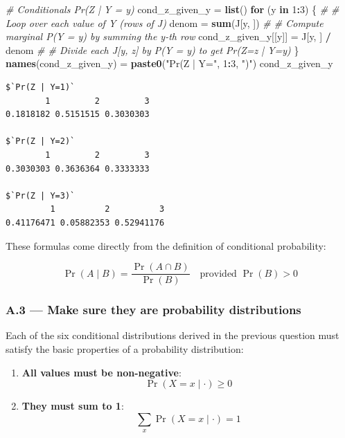 \documentclass[
]{article}
\newenvironment{Shaded}{\begin{snugshade}}{\end{snugshade}}
\newcommand{\CommentTok}[1]{\textcolor[rgb]{0.56,0.35,0.01}{\textit{#1}}}
\newcommand{\ControlFlowTok}[1]{\textcolor[rgb]{0.13,0.29,0.53}{\textbf{#1}}}
\newcommand{\DecValTok}[1]{\textcolor[rgb]{0.00,0.00,0.81}{#1}}
\newcommand{\FunctionTok}[1]{\textcolor[rgb]{0.13,0.29,0.53}{\textbf{#1}}}
\newcommand{\NormalTok}[1]{#1}
\newcommand{\OtherTok}[1]{\textcolor[rgb]{0.56,0.35,0.01}{#1}}
\newcommand{\SpecialCharTok}[1]{\textcolor[rgb]{0.81,0.36,0.00}{\textbf{#1}}}
\newcommand{\StringTok}[1]{\textcolor[rgb]{0.31,0.60,0.02}{#1}}
\begin{document}
\begin{Shaded}
\begin{Highlighting}[]
\CommentTok{\# Conditionals Pr(Z | Y = y)}
\NormalTok{cond\_z\_given\_y }\OtherTok{=} \FunctionTok{list}\NormalTok{() }
\ControlFlowTok{for}\NormalTok{ (y }\ControlFlowTok{in} \DecValTok{1}\SpecialCharTok{:}\DecValTok{3}\NormalTok{) \{ }\CommentTok{\# \# Loop over each value of Y (rows of J)}
\NormalTok{  denom }\OtherTok{=} \FunctionTok{sum}\NormalTok{(J[y, ]) }\CommentTok{\# \# Compute marginal P(Y = y) by summing the y{-}th row}
\NormalTok{  cond\_z\_given\_y[[y]] }\OtherTok{=}\NormalTok{ J[y, ] }\SpecialCharTok{/}\NormalTok{ denom }\CommentTok{\# \# Divide each J[y, z] by P(Y = y) to get Pr(Z=z | Y=y)}
\NormalTok{\}}
\FunctionTok{names}\NormalTok{(cond\_z\_given\_y) }\OtherTok{=} \FunctionTok{paste0}\NormalTok{(}\StringTok{"Pr(Z | Y="}\NormalTok{, }\DecValTok{1}\SpecialCharTok{:}\DecValTok{3}\NormalTok{, }\StringTok{")"}\NormalTok{)}
\NormalTok{cond\_z\_given\_y}
\end{Highlighting}
\end{Shaded}

\begin{verbatim}
$`Pr(Z | Y=1)`
        1         2         3 
0.1818182 0.5151515 0.3030303 

$`Pr(Z | Y=2)`
        1         2         3 
0.3030303 0.3636364 0.3333333 

$`Pr(Z | Y=3)`
         1          2          3 
0.41176471 0.05882353 0.52941176 
\end{verbatim}

These formulas come directly from the definition of conditional
probability:

\[
\Pr(A \mid B) = \dfrac{\Pr(A \cap B)}{\Pr(B)} \quad \text{provided } \Pr(B) > 0 
\]

\bigskip

\subsubsection{A.3 --- Make sure they are probability
distributions}\label{a.3-make-sure-they-are-probability-distributions}

Each of the six conditional distributions derived in the previous
question must satisfy the basic properties of a probability
distribution:

\begin{enumerate}
\def\labelenumi{\arabic{enumi}.}
\item
  \textbf{All values must be non-negative}: \[
  \Pr(X = x \mid \cdot) \geq 0
  \]
\item
  \textbf{They must sum to 1}: \[
  \sum_x \Pr(X = x \mid \cdot) = 1
  \]
\end{enumerate}
\end{document}
